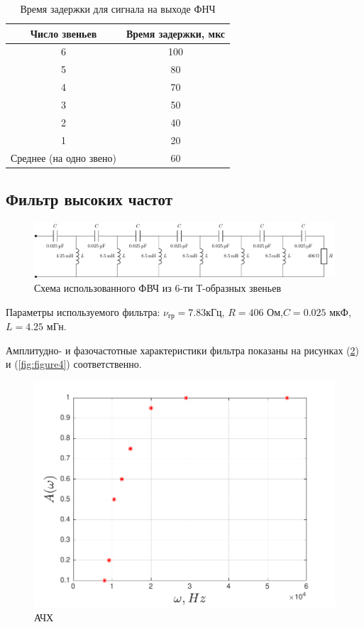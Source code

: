 \begin{table}[H]
\caption{\label{tab:1}Время задержки для сигнала на выходе ФНЧ}
	\begin{center}
		\begin{tabular}{|c|c|}
		\hline
		Число звеньев & Время задержки, мкс \\
		\hline
		6 & 100\\
		5 & 80\\
		4 & 70\\
		3 & 50\\
		2 & 40\\
		1 & 20\\
		\hline
		Среднее (на одно звено) & 60 \\
		\hline
		\end{tabular}
	\end{center}
\end{table}

\subsection{Фильтр высоких частот}
\begin{figure}[H]
	\centering
	\includegraphics[scale=0.75]{chem/chem5}
	\caption{ Схема использованного ФВЧ из 6-ти Т-образных звеньев}
	\label{fig:4}
\end{figure}
Параметры используемого фильтра: $\nu_{\text{гр}}=7.83$кГц, $R=406$ Ом,$C=0.025$ мкФ,
$L=4.25$ мГн. 

Амплитудно- и фазочастотные характеристики фильтра показаны на рисунках (\ref{fig:figure3}) и (\ref{fig:figure4}) соответственно.
\begin{figure}[h!]
	\centering
	\includegraphics[scale=0.9]{graph/graph3}
	\caption{АЧХ}
	\label{fig:figure3}
\end{figure}

